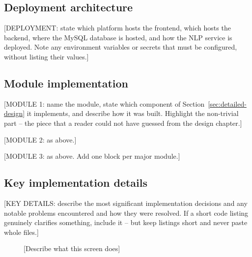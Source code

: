 \subsection{Deployment architecture}
\label{subsec:deployment}

[DEPLOYMENT: state which platform hosts the frontend, which hosts the
backend, where the MySQL database is hosted, and how the NLP service is
deployed. Note any environment variables or secrets that must be
configured, without listing their values.]

\subsection{Module implementation}
\label{subsec:module-implementation}

[MODULE 1: name the module, state which component of
Section~\ref{sec:detailed-design} it implements, and describe how it
was built. Highlight the non-trivial part -- the piece that a reader
could not have guessed from the design chapter.]

[MODULE 2: as above.]

[MODULE 3: as above. Add one block per major module.]

\subsection{Key implementation details}
\label{subsec:key-details}

[KEY DETAILS: describe the most significant implementation decisions
and any notable problems encountered and how they were resolved. If a
short code listing genuinely clarifies something, include it -- but
keep listings short and never paste whole files.]

\begin{figure}[H]
  \centering
  \caption{[Describe what this screen does]}
  \label{fig:screenshot-1}
\end{figure}

